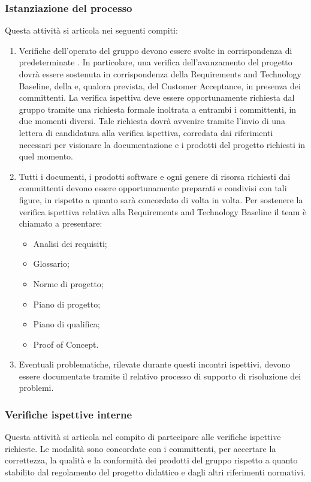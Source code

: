 \subsubsection{Istanziazione del processo}
Questa attività si articola nei seguenti compiti:
\begin{enumerate}
    \item Verifiche dell'operato del gruppo devono essere svolte in corrispondenza di predeterminate . In particolare, una verifica dell'avanzamento del progetto dovrà essere sostenuta in corrispondenza della Requirements and Technology Baseline, della  e, qualora prevista, del Customer Acceptance, in presenza dei committenti. La verifica ispettiva deve essere opportunamente richiesta dal gruppo tramite una richiesta formale inoltrata a entrambi i committenti, in due momenti diversi. Tale richiesta dovrà avvenire tramite l'invio di una lettera di candidatura alla verifica ispettiva, corredata dai riferimenti necessari per visionare la documentazione e i prodotti del progetto richiesti in quel momento.
    \item Tutti i documenti, i prodotti software e ogni genere di risorsa richiesti dai committenti devono essere opportunamente preparati e condivisi con tali figure, in rispetto a quanto sarà concordato di volta in volta. Per sostenere la verifica ispettiva relativa alla Requirements and Technology Baseline il team è chiamato a presentare:
    \begin{itemize}
        \item Analisi dei requisiti;
        \item Glossario;
        \item Norme di progetto;
        \item Piano di progetto;
        \item Piano di qualifica;
        \item Proof of Concept.
    \end{itemize}
    \item Eventuali problematiche, rilevate durante questi incontri ispettivi, devono essere documentate tramite il relativo processo di supporto di risoluzione dei problemi.
\end{enumerate}
\subsubsection{Verifiche ispettive interne}
Questa attività si articola nel compito di partecipare alle verifiche ispettive richieste. Le modalità sono concordate con i committenti, per accertare la correttezza, la qualità e la conformità dei prodotti del gruppo rispetto a quanto stabilito dal regolamento del progetto didattico e dagli altri riferimenti normativi.

